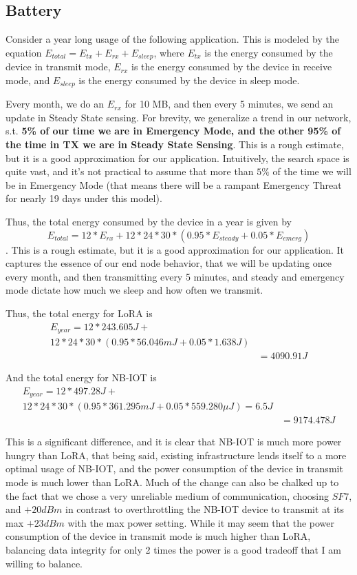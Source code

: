 \subsection{Battery}
\label{sec:Battery}

Consider a year long usage of the following application. This is modeled by the equation $E_{total} = E_{tx} + E_{rx} + E_{sleep}$, where $E_{tx}$ is the energy consumed by the device in transmit mode, $E_{rx}$ is the energy consumed by the device in receive mode, and $E_{sleep}$ is the energy consumed by the device in sleep mode.

Every month, we do an $E_{rx}$ for 10 MB, and then every 5 minutes, we send an update in Steady State sensing. For brevity, we generalize a trend in our network, s.t. \textbf{5\% of our time we are in Emergency Mode, and the other 95\% of the time in TX we are in Steady State Sensing}. This is a rough estimate, but it is a good approximation for our application. Intuitively, the search space is quite vast, and it's not practical to assume that more than $5\%$ of the time we will be in Emergency Mode (that means there will be a rampant Emergency Threat for nearly 19 days under this model).


Thus, the total energy consumed by the device in a year is given by $$E_{total} = 12 * E_{rx} + 12 * 24 * 30 * (0.95 * E_{steady} + 0.05 * E_{emerg})$$ . This is a rough estimate, but it is a good approximation for our application. It captures the essence of our end node behavior, that we will be updating once every month, and then transmitting every 5 minutes, and steady and emergency mode dictate how much we sleep and how often we transmit. 


Thus, the total energy for LoRA is
$$\begin{aligned}E_{year} = 12 * 243.605 J +&\\ 12 * 24 * 30 * (0.95 * 56.046 mJ + 0.05 * 1.638 J) \\&= 4090.91 J\end{aligned}$$

And the total energy for NB-IOT is
$$\begin{aligned}E_{year} = 12 * 497.28 J +&\\ 12 * 24 * 30 * (0.95 * 361.295 mJ + 0.05 * 559.280 \mu J) = 6.5 J \\&= 9174.478 J\end{aligned}$$

This is a significant difference, and it is clear that NB-IOT is much more power hungry than LoRA, that being said, existing infrastructure lends itself to a more optimal usage of NB-IOT, and the power consumption of the device in transmit mode is much lower than LoRA. Much of the change can also be chalked up to the fact that we chose a very unreliable medium of communication, choosing $SF7$, and $+20 dBm$ in contrast to overthrottling the NB-IOT device to transmit at its max $+23dBm$ with the max power setting. While it may seem that the power consumption of the device in transmit mode is much higher than LoRA, balancing data integrity for only 2 times the power is a good tradeoff that I am willing to balance. 


